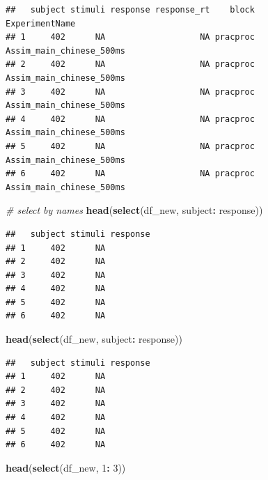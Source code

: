 \documentclass[]{book}
\newenvironment{Shaded}{\begin{snugshade}}{\end{snugshade}}
\newcommand{\KeywordTok}[1]{\textcolor[rgb]{0.13,0.29,0.53}{\textbf{#1}}}
\newcommand{\DecValTok}[1]{\textcolor[rgb]{0.00,0.00,0.81}{#1}}
\newcommand{\StringTok}[1]{\textcolor[rgb]{0.31,0.60,0.02}{#1}}
\newcommand{\CommentTok}[1]{\textcolor[rgb]{0.56,0.35,0.01}{\textit{#1}}}
\newcommand{\OperatorTok}[1]{\textcolor[rgb]{0.81,0.36,0.00}{\textbf{#1}}}
\newcommand{\NormalTok}[1]{#1}
\begin{document}
\begin{verbatim}
##   subject stimuli response response_rt    block           ExperimentName
## 1     402      NA                   NA pracproc Assim_main_chinese_500ms
## 2     402      NA                   NA pracproc Assim_main_chinese_500ms
## 3     402      NA                   NA pracproc Assim_main_chinese_500ms
## 4     402      NA                   NA pracproc Assim_main_chinese_500ms
## 5     402      NA                   NA pracproc Assim_main_chinese_500ms
## 6     402      NA                   NA pracproc Assim_main_chinese_500ms
\end{verbatim}

\begin{Shaded}
\begin{Highlighting}[]
\CommentTok{# select by names}
\KeywordTok{head}\NormalTok{(}\KeywordTok{select}\NormalTok{(df_new, subject}\OperatorTok{:}\StringTok{ }\NormalTok{response))}
\end{Highlighting}
\end{Shaded}

\begin{verbatim}
##   subject stimuli response
## 1     402      NA         
## 2     402      NA         
## 3     402      NA         
## 4     402      NA         
## 5     402      NA         
## 6     402      NA
\end{verbatim}

\begin{Shaded}
\begin{Highlighting}[]
\KeywordTok{head}\NormalTok{(}\KeywordTok{select}\NormalTok{(df_new, subject}\OperatorTok{:}\StringTok{ }\NormalTok{response))}
\end{Highlighting}
\end{Shaded}

\begin{verbatim}
##   subject stimuli response
## 1     402      NA         
## 2     402      NA         
## 3     402      NA         
## 4     402      NA         
## 5     402      NA         
## 6     402      NA
\end{verbatim}

\begin{Shaded}
\begin{Highlighting}[]
\KeywordTok{head}\NormalTok{(}\KeywordTok{select}\NormalTok{(df_new, }\DecValTok{1}\OperatorTok{:}\StringTok{ }\DecValTok{3}\NormalTok{))}
\end{Highlighting}
\end{Shaded}
\end{document}
